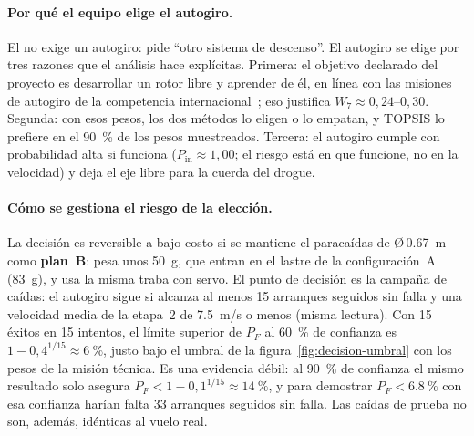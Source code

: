 \paragraph{Por qué el equipo elige el autogiro.} El  no exige un autogiro: pide
``otro sistema de descenso''. El autogiro se elige por tres razones que el análisis
hace explícitas. Primera: el objetivo declarado del proyecto es desarrollar un rotor libre
y aprender de él, en línea con las misiones de autogiro de la competencia
internacional~\cite{cansat2019,cansat2025}; eso justifica $W_7\approx0{,}24$--$0{,}30$.
Segunda: con esos pesos, los dos métodos lo eligen o lo empatan, y TOPSIS lo prefiere
en el \SI{90}{\percent} de los pesos muestreados. Tercera: el autogiro cumple
 con probabilidad alta si funciona ($P_{\mathrm{in}}\approx1{,}00$; el riesgo
está en que funcione, no en la velocidad) y deja el eje libre para la cuerda del drogue.

\paragraph{Cómo se gestiona el riesgo de la elección.} La decisión es reversible a bajo
costo si se mantiene el paracaídas de Ø\,\SI{0.67}{m} como \textbf{plan~B}: pesa unos
\SI{50}{g}, que entran en el lastre de la configuración~A (\SI{83}{g}), y usa la misma
traba con servo. El punto de decisión es la campaña de caídas: el autogiro sigue si
alcanza al menos 15 arranques seguidos sin falla y una velocidad media de la etapa~2 de
\SI{7.5}{m/s} o menos (misma lectura). Con 15 éxitos en 15 intentos, el límite superior de
$P_{F}$ al \SI{60}{\percent} de confianza es $1-0{,}4^{1/15}\approx\SI{6}{\percent}$, justo
bajo el umbral de la figura~\ref{fig:decision-umbral} con los pesos de la misión técnica.
Es una evidencia débil: al \SI{90}{\percent} de confianza el mismo resultado solo asegura
$P_F<1-0{,}1^{1/15}\approx\SI{14}{\percent}$, y para demostrar $P_F<\SI{6.8}{\percent}$
con esa confianza harían falta 33 arranques seguidos sin falla. Las caídas de prueba no
son, además, idénticas al vuelo real.

